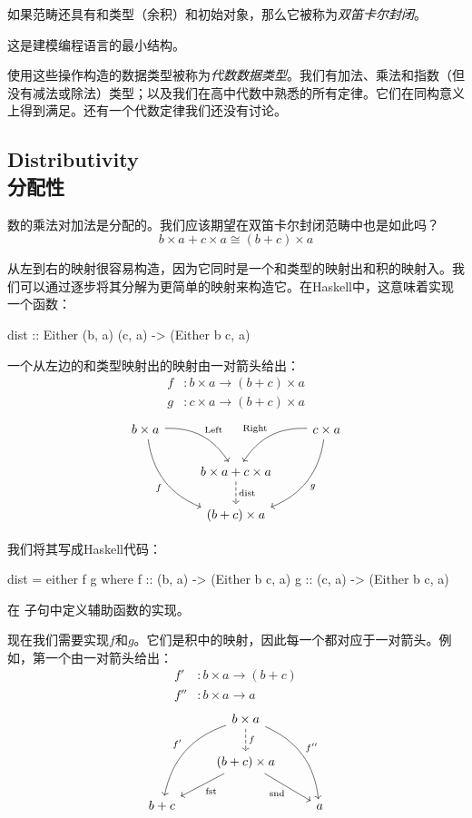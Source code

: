 \documentclass[DaoFP]{subfiles}
\begin{document}
如果范畴还具有和类型（余积）和初始对象，那么它被称为\emph{双笛卡尔封闭}。

这是建模编程语言的最小结构。

使用这些操作构造的数据类型被称为\emph{代数数据类型}。我们有加法、乘法和指数（但没有减法或除法）类型；以及我们在高中代数中熟悉的所有定律。它们在同构意义上得到满足。还有一个代数定律我们还没有讨论。

\subsection{Distributivity\\分配性}

数的乘法对加法是分配的。我们应该期望在双笛卡尔封闭范畴中也是如此吗？
\[b \times a + c \times a \cong (b + c) \times a\]

从左到右的映射很容易构造，因为它同时是一个和类型的映射出和积的映射入。我们可以通过逐步将其分解为更简单的映射来构造它。在Haskell中，这意味着实现一个函数：
\begin{haskell}
dist :: Either (b, a) (c, a) -> (Either b c, a)
\end{haskell}
一个从左边的和类型映射出的映射由一对箭头给出：
\begin{align*}
f &\colon b\times a \to (b + c) \times a \\
g &\colon c\times a \to (b + c) \times a
\end{align*}
\[
\begin{tikzcd}
b \times a
\arrow[dr,  bend left, "\text{Left}"]
\arrow[ddr, bend right, "f"']
&& c \times a
\arrow[dl, bend right, "\text{Right}"']
\arrow[ddl, bend left, "g"]
\\
& b \times a + c \times a
\arrow[d, dashed, "\text{dist}"]
\\
& (b + c) \times a
\end{tikzcd}
\]

我们将其写成Haskell代码：
\begin{haskell}
dist = either f g
where
f   :: (b, a) -> (Either b c, a)
g   :: (c, a) -> (Either b c, a)
\end{haskell}
在 子句中定义辅助函数的实现。

现在我们需要实现$f$和$g$。它们是积中的映射，因此每一个都对应于一对箭头。例如，第一个由一对箭头给出：
\begin{align*}
f' &\colon b \times a \to (b + c) \\
f'' &\colon b \times a \to a
\end{align*}
\[
\begin{tikzcd}
& b \times a
\arrow[d, dashed, "f"]
\arrow[ddl, bend right, "f'"']
\arrow[ddr, bend left, "f''"]
\\
& (b + c) \times a
\arrow[dl,  "\text{fst}"]
\arrow[dr,   "\text{snd}"']
\\
b + c && a
\end{tikzcd}
\]
\end{document}
